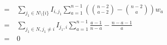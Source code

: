 \begin{equation}
\begin{array}{rll}
        = & \ \sum\limits_{j_1 \in N \setminus \{i\}} I_{i,j_1} \sum\limits_{a=1}^{n-1} \left( \binom{n-2}{a-2} - \binom{n-2}{a} \right) w_a \\
        = & \ \sum\limits_{j_1 \in N, j_1 \neq i} I_{j_1,i} \sum\limits_{a=1}^{n-1} \frac{a-1}{n-a} - \frac{n-a-1}{a} \\
        = & \ 0
	\end{array}
\end{equation}

